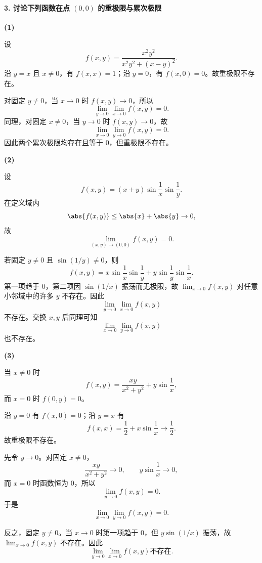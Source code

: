 \paragraph{3. 讨论下列函数在点 $(0,0)$ 的重极限与累次极限}

\textbf{(1)}
\begin{xsolution}
设
\[
  f(x,y)=\frac{x^2y^2}{x^2y^2+(x-y)^2}.
\]
沿 $y=x$ 且 $x\ne0$，有 $f(x,x)=1$；沿 $y=0$，有 $f(x,0)=0$。故重极限不存在。

对固定 $y\ne0$，当 $x\to0$ 时 $f(x,y)\to0$，所以
\[
  \lim_{y\to0}\lim_{x\to0}f(x,y)=0.
\]
同理，对固定 $x\ne0$，当 $y\to0$ 时 $f(x,y)\to0$，故
\[
  \lim_{x\to0}\lim_{y\to0}f(x,y)=0.
\]
因此两个累次极限均存在且等于 $0$，但重极限不存在。
\end{xsolution}

\textbf{(2)}
\begin{xsolution}
设
\[
  f(x,y)=(x+y)\sin\frac1x\sin\frac1y.
\]
在定义域内
\[
  \abs{f(x,y)}\le\abs{x}+\abs{y}\to0,
\]
故
\[
  \boxed{\displaystyle
  \lim_{(x,y)\to(0,0)}f(x,y)=0}.
\]

若固定 $y\ne0$ 且 $\sin(1/y)\ne0$，则
\[
  f(x,y)
  =x\sin\frac1x\sin\frac1y
  +y\sin\frac1y\sin\frac1x.
\]
第一项趋于 $0$，第二项因 $\sin(1/x)$ 振荡而无极限，故 $\lim_{x\to0}f(x,y)$ 对任意小邻域中的许多 $y$ 不存在。因此
\[
  \lim_{y\to0}\lim_{x\to0}f(x,y)
\]
不存在。交换 $x,y$ 后同理可知
\[
  \lim_{x\to0}\lim_{y\to0}f(x,y)
\]
也不存在。
\end{xsolution}

\textbf{(3)}
\begin{xsolution}
当 $x\ne0$ 时
\[
  f(x,y)=\frac{xy}{x^2+y^2}+y\sin\frac1x,
\]
而 $x=0$ 时 $f(0,y)=0$。

沿 $y=0$ 有 $f(x,0)=0$；沿 $y=x$ 有
\[
  f(x,x)=\frac12+x\sin\frac1x\to\frac12.
\]
故重极限不存在。

先令 $y\to0$。对固定 $x\ne0$，
\[
  \frac{xy}{x^2+y^2}\to0,
  \qquad
  y\sin\frac1x\to0,
\]
而 $x=0$ 时函数恒为 $0$，所以
\[
  \lim_{y\to0}f(x,y)=0.
\]
于是
\[
  \boxed{\displaystyle
  \lim_{x\to0}\lim_{y\to0}f(x,y)=0}.
\]

反之，固定 $y\ne0$。当 $x\to0$ 时第一项趋于 $0$，但 $y\sin(1/x)$ 振荡，故 $\lim_{x\to0}f(x,y)$ 不存在。因此
\[
  \boxed{\displaystyle
  \lim_{y\to0}\lim_{x\to0}f(x,y)
  \text{不存在}}.
\]
\end{xsolution}

